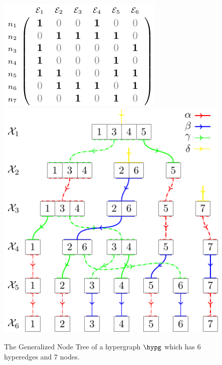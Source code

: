 \documentclass[aps, 10pt, english, twoside, twocolumn, pra, nofootinbib, tightenlines, longbibliography, superscriptaddress]{revtex4-1}
\begin{document}
    \begin{figure}
        \includegraphics[width=\linewidth]{figures/hypergraph_matrix_2_standalone/figure.pdf}
        \includegraphics[width=\linewidth]{figures/generalized_node_tree_2/figure.pdf}
        \caption{The Generalized Node Tree of a hypergraph $\hypg$ which has $6$ hyperedges and $7$ nodes.}
    \end{figure}
\end{document}

